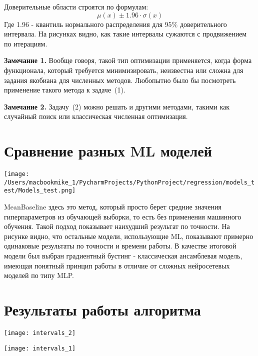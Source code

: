 \documentclass[12pt]{article}
\begin{document}
Доверительные области строятся по формулам:
\[
\mu(x) \pm 1.96 \cdot \sigma(x)
\]
Где 1.96 - квантиль нормального распределения для $95\%$ доверительного интервала. На рисунках видно, как такие интервалы сужаются
с продвижением по итерациям.

\vspace{0.5em}

\textbf{Замечание 1.} Вообще говоря, такой тип оптимизации применяется, когда форма функционала, который требуется минимизировать,
неизвестна или сложна для задания якобиана для численных методов. Любопытно было бы посмотреть применение такого метода к задаче~(1).

\vspace{0.5em}

\textbf{Замечание 2.} Задачу~(2) можно решать и другими методами, такими как случайный поиск или классическая численная оптимизация.

\section*{Сравнение разных ML моделей}

\begin{center}
    \texttt{[image: /Users/macbookmike\_1/PycharmProjects/PythonProject/regression/models\_test/Models\_test.png]}
\end{center}

MeanBaseline здесь это метод, который просто берет средние значения гиперпараметров из обучающей выборки, то есть без применения машинного обучения.
Такой подход показывает наихудший результат по точности.
На рисунке видно, что остальные модели, использующие ML, показывают примерно одинаковые результаты по точности и времени работы.
В качестве итоговой модели был выбран градиентный бустинг - классическая ансамблевая модель, имеющая понятный принцип работы в отличие
от сложных нейросетевых моделей по типу MLP.

\section*{Результаты работы алгоритма}

\begin{center}
    \begin{minipage}{0.48\textwidth}
        \texttt{[image: intervals\_2]}
    \end{minipage}
    \hfill
    \begin{minipage}{0.48\textwidth}
        \texttt{[image: intervals\_1]}
    \end{minipage}
\end{center}
\end{document}
